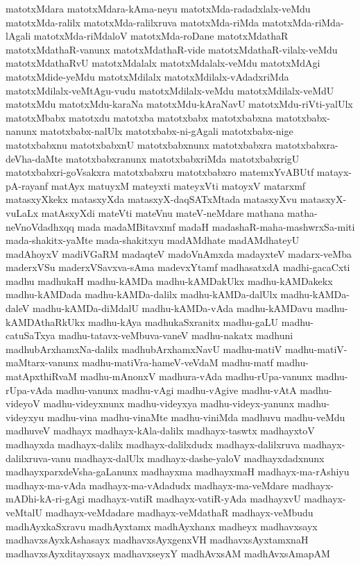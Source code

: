 {matotxMdara
matotxMdara-kAma-neyu
matotxMda-radadxlalx-veMdu
matotxMda-ralilx
matotxMda-ralilxruva
matotxMda-riMda
matotxMda-riMda-lAgali
matotxMda-riMdaloV
matotxMda-roDane
matotxMdathaR
matotxMdathaR-vanunx
matotxMdathaR-vide
matotxMdathaR-vilalx-veMdu
matotxMdathaRvU
matotxMdalalx
matotxMdalalx-veMdu
matotxMdAgi
matotxMdide-yeMdu
matotxMdilalx
matotxMdilalx-vAdadxriMda
matotxMdilalx-veMtAgu-vudu
matotxMdilalx-veMdu
matotxMdilalx-veMdU
matotxMdu
matotxMdu-karaNa
matotxMdu-kAraNavU
matotxMdu-riVti-yalUlx
matotxMbabx
matotxdu
matotxba
matotxbabx
matotxbabxna
matotxbabx-nanunx
matotxbabx-nalUlx
matotxbabx-ni-gAgali
matotxbabx-nige
matotxbabxnu
matotxbabxnU
matotxbabxnunx
matotxbabxra
matotxbabxra-deVha-daMte
matotxbabxranunx
matotxbabxriMda
matotxbabxrigU
matotxbabxri-goVsakxra
matotxbabxru
matotxbabxro
matemxYvABUtf
matayx-pA-rayanf
matAyx
matuyxM
mateyxti
mateyxVti
matoyxV
matarxmf
matasxyXkekx
matasxyXda
matasxyX-daqSATxMtada
matasxyXvu
matasxyX-vuLaLx
matAsxyXdi
mateVti
mateVnu
mateV-neMdare
mathana
matha-neVnoVdadhxqq
mada
madaMBitavxmf
madaH
madashaR-maha-mashwrxSa-miti
mada-shakitx-yaMte
mada-shakitxyu
madAMdhate
madAMdhateyU
madAhoyxV
madiVGaRM
madaqteV
madoVnAmxda
madayxteV
madarx-veMba
maderxVSu
maderxVSavxva-sAma
madevxYtamf
madhasatxdA
madhi-gacaCxti
madhu
madhukaH
madhu-kAMDa
madhu-kAMDakUkx
madhu-kAMDakekx
madhu-kAMDada
madhu-kAMDa-dalilx
madhu-kAMDa-dalUlx
madhu-kAMDa-daleV
madhu-kAMDa-diMdalU
madhu-kAMDa-vAda
madhu-kAMDavu
madhu-kAMDAthaRkUkx
madhu-kAya
madhukaSxranitx
madhu-gaLU
madhu-catuSaTxya
madhu-tatavx-veMbuva-vaneV
madhu-nakatx
madhuni
madhubArxhamxNa-dalilx
madhubArxhamxNavU
madhu-matiV
madhu-matiV-maMtarx-vanunx
madhu-matiVra-hameV-veVdaM
madhu-matf
madhu-matApxthiRvaM
madhu-mAnonxV
madhura-vAda
madhu-rUpa-vanunx
madhu-rUpa-vAda
madhu-vanunx
madhu-vAgi
madhu-vAgive
madhu-vAtA
madhu-videyoV
madhu-videyxnunx
madhu-videyxya
madhu-videyx-yanunx
madhu-videyxyu
madhu-vina
madhu-vinaMte
madhu-viniMda
madhuvu
madhu-veMdu
madhuveV
madhayx
madhayx-kAla-dalilx
madhayx-taswtx
madhayxtoV
madhayxda
madhayx-dalilx
madhayx-dalilxdudx
madhayx-dalilxruva
madhayx-dalilxruva-vanu
madhayx-dalUlx
madhayx-dashe-yaloV
madhayxdadxnunx
madhayxparxdeVsha-gaLanunx
madhayxma
madhayxmaH
madhayx-ma-rAshiyu
madhayx-ma-vAda
madhayx-ma-vAdadudx
madhayx-ma-veMdare
madhayx-mADhi-kA-ri-gAgi
madhayx-vatiR
madhayx-vatiR-yAda
madhayxvU
madhayx-veMtalU
madhayx-veMdadare
madhayx-veMdathaR
madhayx-veMbudu
madhAyxkaSxravu
madhAyxtamx
madhAyxhanx
madheyx
madhavxsayx
madhavxsAyxkAshasayx
madhavxsAyxgenxVH
madhavxsAyxtamxnaH
madhavxsAyxditayxsayx
madhavxseyxY
madhAvxsAM
madhAvxsAmapAM
}
